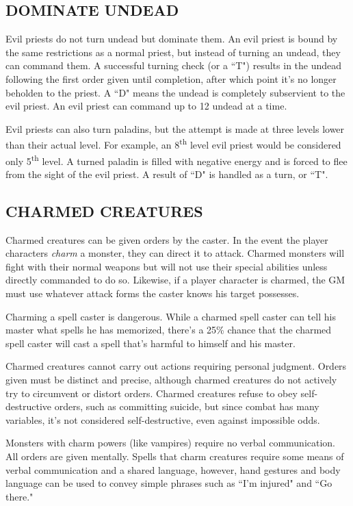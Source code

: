 \begin{multicols}{2}
\subsection{DOMINATE UNDEAD}

Evil priests do not turn undead but dominate them.  An evil priest is bound by the same restrictions as a normal priest, but instead of turning an undead, they can command them.  A successful turning check (or a ``T") results in the undead following the first order given until completion, after which point it's no longer beholden to the priest.  A ``D" means the undead is completely subservient to the evil priest.  An evil priest can command up to 12 undead at a time.

Evil priests can also turn paladins, but the attempt is made at three levels lower than their actual level.  For example, an 8\textsuperscript{th} level evil priest would be considered only 5\textsuperscript{th} level.  A turned paladin is filled with negative energy and is forced to flee from the sight of the evil priest.  A result of ``D" is handled as a turn, or ``T".

\subsection{CHARMED CREATURES}

Charmed creatures can be given orders by the caster.  In the event the player characters \textit{charm} a monster, they can direct it to attack.  Charmed monsters will fight with their normal weapons but will not use their special abilities unless directly commanded to do so.  Likewise, if a player character is charmed, the GM must use whatever attack forms the caster knows his target possesses.  

Charming a spell caster is dangerous.  While a charmed spell caster can tell his master what spells he has memorized, there's a 25\% chance that the charmed spell caster will cast a spell that's harmful to himself and his master.

 
Charmed creatures cannot carry out actions requiring personal judgment.  Orders given must be distinct and precise, although charmed creatures do not actively try to circumvent or distort orders.  Charmed creatures refuse to obey self-destructive orders, such as committing suicide, but since combat has many variables, it's not considered self-destructive, even against impossible odds.

Monsters with charm powers (like vampires) require no verbal communication.  All orders are given mentally.  Spells that charm creatures require some means of verbal communication and a shared language, however, hand gestures and body language can be used to convey simple phrases such as ``I'm injured" and ``Go there."


\end{multicols}
